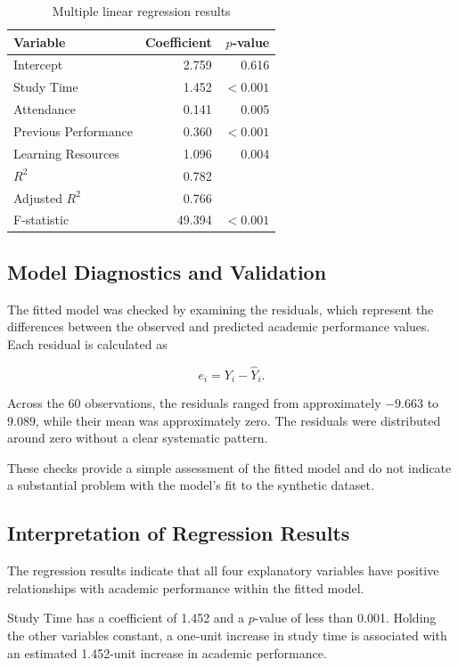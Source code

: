 \begin{table}[htbp]
\centering
\caption{Multiple linear regression results}
\label{tab:regression}
\begin{tabular}{lrr}
\toprule
Variable & Coefficient & $p$-value \\
\midrule
Intercept & 2.759 & 0.616 \\
Study Time & 1.452 & $<0.001$ \\
Attendance & 0.141 & 0.005 \\
Previous Performance & 0.360 & $<0.001$ \\
Learning Resources & 1.096 & 0.004 \\
\midrule
$R^2$ & 0.782 & \\
Adjusted $R^2$ & 0.766 & \\
F-statistic & 49.394 & $<0.001$ \\
\bottomrule
\end{tabular}
\end{table}


\subsection{Model Diagnostics and Validation}

The fitted model was checked by examining the residuals, which represent the differences between the observed and predicted academic performance values. Each residual is calculated as

\begin{equation}
e_i = Y_i-\widehat{Y}_i.
\end{equation}

Across the 60 observations, the residuals ranged from approximately $-9.663$ to $9.089$, while their mean was approximately zero. The residuals were distributed around zero without a clear systematic pattern.

These checks provide a simple assessment of the fitted model and do not indicate a substantial problem with the model's fit to the synthetic dataset.

\subsection{Interpretation of Regression Results}

The regression results indicate that all four explanatory variables have positive relationships with academic performance within the fitted model.

Study Time has a coefficient of 1.452 and a $p$-value of less than 0.001. Holding the other variables constant, a one-unit increase in study time is associated with an estimated 1.452-unit increase in academic performance.

